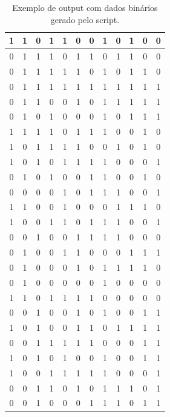\begin{table}[H]
\caption{Exemplo de output com dados binários gerado pelo script.}
\label{q.output2}
\centering
\begin{tabular}{|c|c|c|c|c|c|c|c|c|c|c|c|}
\hline
1 & 1 & 0 & 1 & 1 & 0 & 0 & 1 & 0 & 1 & 0 & 0 \\ \hline
0 & 1 & 1 & 1 & 0 & 1 & 1 & 0 & 1 & 1 & 0 & 0 \\ \hline
0 & 1 & 1 & 1 & 1 & 1 & 0 & 1 & 0 & 1 & 1 & 0 \\ \hline
0 & 1 & 1 & 1 & 1 & 1 & 1 & 1 & 1 & 1 & 1 & 1 \\ \hline
0 & 1 & 1 & 0 & 0 & 1 & 0 & 1 & 1 & 1 & 1 & 1 \\ \hline
0 & 1 & 0 & 1 & 0 & 0 & 0 & 1 & 0 & 1 & 1 & 1 \\ \hline
1 & 1 & 1 & 1 & 0 & 1 & 1 & 1 & 0 & 0 & 1 & 0 \\ \hline
1 & 0 & 1 & 1 & 1 & 1 & 0 & 0 & 1 & 0 & 1 & 0 \\ \hline
1 & 0 & 1 & 0 & 1 & 1 & 1 & 1 & 0 & 0 & 0 & 1 \\ \hline
0 & 1 & 0 & 1 & 0 & 0 & 1 & 1 & 0 & 0 & 1 & 0 \\ \hline
0 & 0 & 0 & 0 & 1 & 0 & 1 & 1 & 1 & 0 & 0 & 1 \\ \hline
1 & 1 & 0 & 0 & 1 & 0 & 0 & 0 & 1 & 1 & 1 & 0 \\ \hline
1 & 0 & 0 & 1 & 1 & 0 & 1 & 1 & 1 & 0 & 0 & 1 \\ \hline
0 & 0 & 1 & 0 & 0 & 1 & 1 & 1 & 1 & 0 & 0 & 0 \\ \hline
0 & 1 & 0 & 0 & 1 & 1 & 0 & 0 & 0 & 1 & 1 & 1 \\ \hline
0 & 1 & 0 & 0 & 0 & 1 & 0 & 1 & 1 & 1 & 1 & 0 \\ \hline
0 & 1 & 0 & 0 & 0 & 0 & 0 & 1 & 0 & 0 & 0 & 0 \\ \hline
1 & 1 & 0 & 1 & 1 & 1 & 1 & 0 & 0 & 0 & 0 & 0 \\ \hline
0 & 0 & 1 & 0 & 0 & 1 & 0 & 1 & 0 & 0 & 1 & 1 \\ \hline
1 & 0 & 1 & 0 & 0 & 1 & 1 & 0 & 1 & 1 & 1 & 1 \\ \hline
0 & 0 & 1 & 1 & 1 & 1 & 1 & 0 & 0 & 0 & 1 & 1 \\ \hline
1 & 0 & 1 & 0 & 1 & 0 & 0 & 1 & 0 & 0 & 1 & 1 \\ \hline
1 & 0 & 0 & 1 & 1 & 1 & 1 & 1 & 0 & 0 & 0 & 1 \\ \hline
0 & 0 & 1 & 1 & 0 & 1 & 0 & 1 & 1 & 1 & 0 & 1 \\ \hline
0 & 0 & 1 & 0 & 0 & 0 & 1 & 1 & 1 & 0 & 1 & 1 \\ \hline

\end{tabular}
\end{table}
